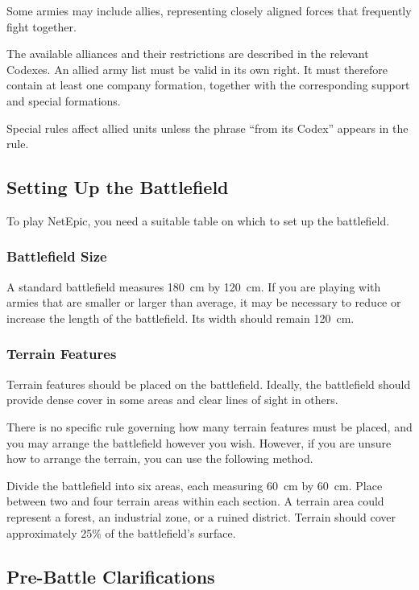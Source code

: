 Some armies may include allies, representing closely aligned forces that frequently fight together.

The available alliances and their restrictions are described in the relevant Codexes. An allied army list must be valid in its own right. It must therefore contain at least one company formation, together with the corresponding support and special formations.

Special rules affect allied units unless the phrase ``from its Codex'' appears in the rule.

\subsection{Setting Up the Battlefield}

To play NetEpic, you need a suitable table on which to set up the battlefield.

\subsubsection{Battlefield Size}

A standard battlefield measures 180~cm by 120~cm. If you are playing with armies that are smaller or larger than average, it may be necessary to reduce or increase the length of the battlefield. Its width should remain 120~cm.

\subsubsection{Terrain Features}

Terrain features should be placed on the battlefield. Ideally, the battlefield should provide dense cover in some areas and clear lines of sight in others.

There is no specific rule governing how many terrain features must be placed, and you may arrange the battlefield however you wish. However, if you are unsure how to arrange the terrain, you can use the following method.

Divide the battlefield into six areas, each measuring 60~cm by 60~cm. Place between two and four terrain areas within each section. A terrain area could represent a forest, an industrial zone, or a ruined district. Terrain should cover approximately 25\% of the battlefield's surface.

\subsection{Pre-Battle Clarifications}

